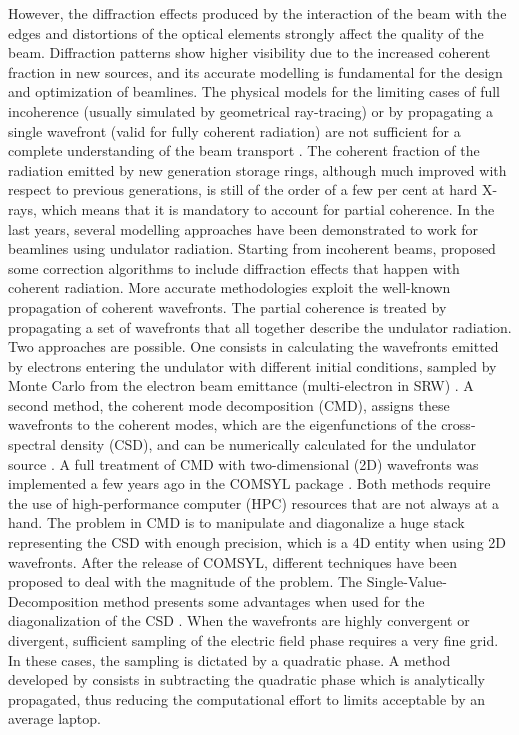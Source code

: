 \documentclass[preprint]{iucr}
\newcommand{\inred}[1]{{\color{red}#1}}
\begin{document}
However, the diffraction effects produced by the interaction of the beam with the edges and distortions of the optical elements strongly affect the quality of the beam. Diffraction patterns show higher visibility due to the increased coherent fraction in new sources, and its accurate \inred{modelling} is fundamental for the design and optimization of beamlines. The physical models for the limiting cases of full incoherence (usually simulated by geometrical ray-tracing) or by propagating a single wavefront (valid for fully coherent radiation) are not sufficient for a complete understanding of the beam transport \cite{hierarchical}. The coherent fraction of the radiation emitted by new generation storage rings, although much improved with respect to previous generations, is still of the order of a few per cent at hard X-rays, which means that it is mandatory to account for partial coherence. In the last years\inred{,} several modelling approaches have \inred{been} demonstrated to work for beamlines using undulator radiation. Starting from incoherent beams,  proposed some correction algorithms to include diffraction effects that happen with coherent radiation. More accurate methodologies exploit the well-known propagation of coherent wavefronts. The partial coherence is treated by propagating a set of wavefronts that all together describe the undulator radiation. Two approaches are possible. One consists in calculating the wavefronts emitted by electrons entering the undulator with different initial conditions, sampled by Monte Carlo from the electron beam emittance (multi-electron in SRW) \cite{codeSRW_ME}. A second method, the coherent mode decomposition (CMD), assigns these wavefronts to the coherent modes, which are the eigenfunctions of the cross-spectral density (CSD), and can be numerically calculated for the undulator source \cite{glass2017}.  
\inred{A full treatment of CMD with two-dimensional (2D) wavefronts was implemented a few years ago in the COMSYL package \cite{codeCOMSYL}. Both methods require the use of high-performance computer (HPC) resources that are not always at a hand.
The problem in CMD is to manipulate and diagonalize a huge stack representing the CSD with enough precision, which is a 4D entity when using 2D wavefronts. 
After the release of COMSYL, different techniques have been proposed to deal with the magnitude of the problem. The Single-Value-Decomposition method presents some advantages when used for the diagonalization of the CSD \cite{SVDHanXu}. When the wavefronts are highly convergent or divergent,  sufficient sampling of the electric field phase requires a very fine grid. In these cases, the sampling is dictated by a quadratic phase. A method developed by \citeasnoun{ChubarCMD2022} consists in subtracting the quadratic phase which is analytically propagated, thus reducing the computational effort to limits acceptable by an average laptop.
}
\end{document}
